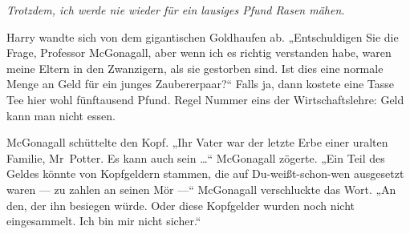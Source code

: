 \emph{Trotzdem, ich werde nie wieder für ein lausiges Pfund Rasen mähen.}

Harry wandte sich von dem gigantischen Goldhaufen ab.
„Entschuldigen Sie die Frage, Professor McGonagall, aber wenn ich es richtig verstanden habe, waren meine Eltern in den Zwanzigern, als sie gestorben sind. Ist dies eine normale Menge an Geld für ein junges Zaubererpaar?“ Falls ja, dann kostete eine Tasse Tee hier wohl fünftausend Pfund. Regel Nummer eins der Wirtschaftslehre: Geld kann man nicht essen.

McGonagall schüttelte den Kopf.
„Ihr Vater war der letzte Erbe einer uralten Familie, Mr~Potter. Es kann auch sein …“ McGonagall zögerte.
„Ein Teil des Geldes könnte von Kopfgeldern stammen, die auf Du-weißt-schon-wen ausgesetzt waren — zu zahlen an seinen Mör —“ McGonagall verschluckte das Wort.
„An den, der ihn besiegen würde. Oder diese Kopfgelder wurden noch nicht eingesammelt. Ich bin mir nicht sicher.“

